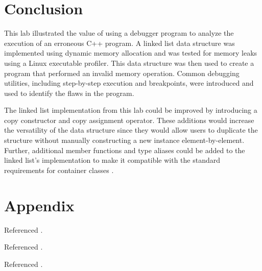 \documentclass[11pt, letterpaper]{article} %
\begin{document}
\section*{Conclusion}

This lab illustrated the value of using a debugger program to analyze the execution of an erroneous C++ program. A linked list data structure was implemented using dynamic memory allocation and was tested for memory leaks using a Linux executable profiler. This data structure was then used to create a program that performed an invalid memory operation.  Common debugging utilities, including step-by-step execution and breakpoints, were introduced and used to identify the flaws in the program.


The linked list implementation from this lab could be improved by introducing a copy constructor and copy assignment operator. These additions would increase the versatility of the data structure since they would allow users to duplicate the structure without manually constructing a new instance element-by-element. Further, additional member functions and type aliases could be added to the linked list's implementation to make it compatible with the standard requirements for container classes \cite[\S26.2.1]{open-std-N4659}.

%
%


\clearpage
\section*{Appendix}
\renewcommand{\thelstlisting}{A.\arabic{lstlisting}}




Referenced \cite{cppreference-std-find-if,cppreference-advance,cppreference-multiset,cppreference-pointer,cppreference-less}.

Referenced \cite{rust-too-many-lists,cppreference-unique-ptr,cppreference-forward-list,cppreference-forward-itr,so-deprecate-std-iterator,cppreference-iterator-traits,cppreference-rule-of-three,cppreference-exchange,stroustrup-c++-core-guidelines}.

Referenced \cite{cppreference-exchange,stroustrup-c++-core-guidelines}.





\clearpage



\end{document}
